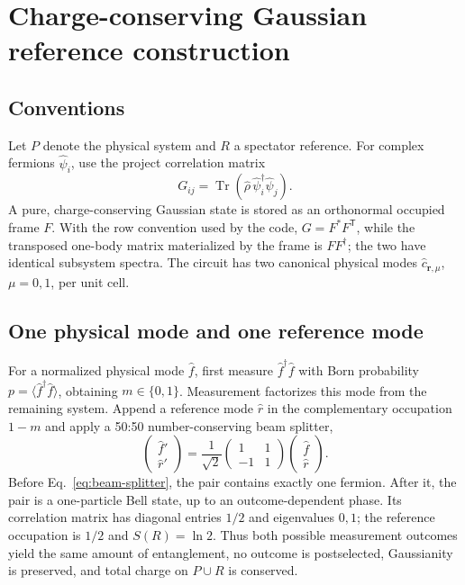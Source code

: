 \documentclass[10pt]{article}
\newcommand{\bfr}{\boldsymbol r}
\newcommand{\hc}{\hat c}
\newcommand{\hr}{\hat r}
\newcommand{\Tr}{\operatorname{Tr}}
\begin{document}
\section{Charge-conserving Gaussian reference construction}

\subsection{Conventions}

Let $P$ denote the physical system and $R$ a spectator reference.  For complex
fermions $\hat\psi_i$, use the project correlation matrix
\begin{equation}
G_{ij}=\Tr(\hat\rho\,\hat\psi_i^\dagger\hat\psi_j).
\end{equation}
A pure, charge-conserving Gaussian state is stored as an orthonormal occupied
frame $F$.  With the row convention used by the code,
$G=F^*F^{\mathsf T}$, while the transposed one-body matrix materialized by the
frame is $FF^\dagger$; the two have identical subsystem spectra.  The circuit
has two canonical physical modes $\hc_{\bfr,\mu}$, $\mu=0,1$, per unit cell.

\subsection{One physical mode and one reference mode}

For a normalized physical mode $\hat f$, first measure
$\hat f^\dagger\hat f$ with Born probability $p=\langle\hat f^\dagger\hat
f\rangle$, obtaining $m\in\{0,1\}$.  Measurement factorizes this mode from the
remaining system.  Append a reference mode $\hr$ in the complementary
occupation $1-m$ and apply a 50:50 number-conserving beam splitter,
\begin{equation}
\begin{pmatrix}\hat f'\\ \hr'\end{pmatrix}
=\frac{1}{\sqrt2}
\begin{pmatrix}1&1\\-1&1\end{pmatrix}
\begin{pmatrix}\hat f\\ \hr\end{pmatrix}.
\label{eq:beam-splitter}
\end{equation}
Before Eq.~\eqref{eq:beam-splitter}, the pair contains exactly one fermion.
After it, the pair is a one-particle Bell state, up to an outcome-dependent
phase.  Its correlation matrix has diagonal entries $1/2$ and eigenvalues
$0,1$; the reference occupation is $1/2$ and $S(R)=\ln2$.  Thus both possible
measurement outcomes yield the same amount of entanglement, no outcome is
postselected, Gaussianity is preserved, and total charge on $P\cup R$ is
conserved.
\end{document}
